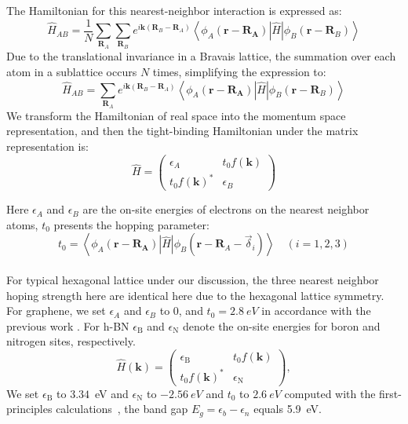 The Hamiltonian for this nearest-neighbor interaction is expressed as:
\begin{equation}
	\hat{H}_{A B}=\frac{1}{N} \sum_{\mathbf{R}_{A}} \sum_{\mathbf{R}_{B}} e^{i \mathbf{k}\left(\mathbf{R}_{B}-\mathbf{R}_{A}\right)}\left\langle\phi_{A}\left(\mathbf{r}-\mathbf{R}_{\mathbf{A}}\right)|\hat H| \phi_{B}\left(\mathbf{r}-\mathbf{R}_{B}\right)\right\rangle
\end{equation}
Due to the translational invariance in a Bravais lattice, the summation over each atom in a sublattice occurs $N$ times, simplifying the expression to:
\begin{equation}
	\hat{H}_{A B}=\sum_{\mathbf{R}_{A}} e^{i \mathbf{k}\left(\mathbf{R}_{B}-\mathbf{R}_{A}\right)}\left\langle\phi_{A}\left(\mathbf{r}-\mathbf{R}_{\mathbf{A}}\right)|\hat{H}| \phi_{B}\left(\mathbf{r}-\mathbf{R}_{B}\right)\right\rangle
\end{equation}
We transform the Hamiltonian of real space into the momentum space representation, and then the
tight-binding Hamiltonian under the matrix representation is:
\begin{equation}
	\hat{H} =\left(\begin{array}{cc}
			\epsilon_{A}            & t_{0} f(\mathbf{k}) \\
			t_{0} f(\mathbf{k})^{*} & \epsilon_{B}
		\end{array}\right)
	\label{eqn: TBh}
\end{equation}

Here $\epsilon_{A}$ and $\epsilon_{B}$ are the on-site energies of electrons on the nearest neighbor atoms, $t_0$ presents the hopping parameter:
$$
	t_{0}=\left\langle\phi_{A}\left(\mathbf{r}-\mathbf{R}_{\mathbf{A}}\right)|\hat{H}| \phi_{B}\left(\mathbf{r}-\mathbf{R}_{A}-\vec{\delta}_{i}\right)\right\rangle \quad(i=1,2,3)
$$\\
For typical hexagonal lattice under our discussion, the three nearest neighbor hoping strength here are identical here due to the hexagonal lattice symmetry. For graphene, we set $\epsilon_{A}$ and $\epsilon_{B}$ to 0, and $t_0=2.8~eV$ in accordance with the previous work  \cite{sarma2011electronic}. For h-BN $\epsilon_{\mathrm{B}}$ and $\epsilon_{\mathrm{N}}$ denote the on-site energies for boron and nitrogen sites, respectively.
\begin{equation}
	\hat{H}(\mathbf{k})=\left(\begin{array}{cc}
			\epsilon_{\mathrm{B}}   & t_{0} f(\mathbf{k})   \\
			t_{0} f(\mathbf{k})^{*} & \epsilon_{\mathrm{N}}
		\end{array}\right),
	\label{eqn:hBNhamiltonian}
\end{equation}
We set $\epsilon_{\mathrm{B}}$ to $3.34$~eV and $\epsilon_{\mathrm{N}}$ to $-2.56~eV$ and $t_0$ to $2.6~eV$ computed with the first-principles calculations~\cite{PhysRevB.51.6868}, the band gap $E_{g}=\epsilon_{b}-\epsilon_{n}$ equals 5.9~eV.

